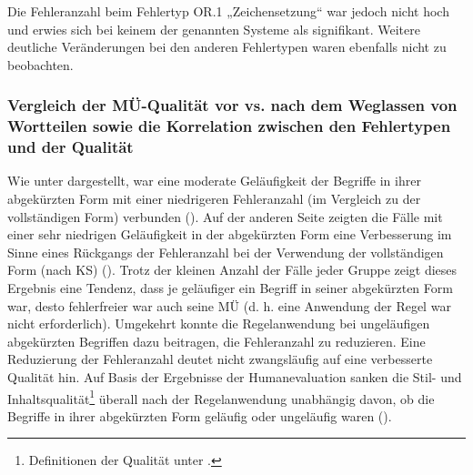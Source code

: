 Die Fehleranzahl beim Fehlertyp OR.1 „Zeichensetzung“ war jedoch nicht hoch und erwies sich bei keinem der genannten Systeme als signifikant. Weitere deutliche Veränderungen bei den anderen Fehlertypen waren ebenfalls nicht zu beobachten.

\subsubsection{Vergleich der MÜ-Qualität vor vs. nach dem Weglassen von Wortteilen sowie die Korrelation zwischen den Fehlertypen und der Qualität}\label{sec:5.3.9.4}

Wie unter  dargestellt, war eine moderate Geläufigkeit der Begriffe in ihrer abgekürzten Form mit einer niedrigeren Fehleranzahl (im Vergleich zu der vollständigen Form) verbunden (). Auf der anderen Seite zeigten die Fälle mit einer sehr niedrigen Geläufigkeit in der abgekürzten Form eine Verbesserung im Sinne eines Rückgangs der Fehleranzahl bei der Verwendung der vollständigen Form (nach KS) (). Trotz der kleinen Anzahl der Fälle jeder Gruppe zeigt dieses Ergebnis eine Tendenz, dass je geläufiger ein Begriff in seiner abgekürzten Form war, desto fehlerfreier war auch seine MÜ (d. h. eine Anwendung der Regel war nicht erforderlich). Umgekehrt konnte die Regelanwendung bei ungeläufigen abgekürzten Begriffen dazu beitragen, die Fehleranzahl zu reduzieren. Eine Reduzierung der Fehleranzahl deutet nicht zwangsläufig auf eine verbesserte Qualität hin. Auf Basis der Ergebnisse der Humanevaluation sanken die Stil- und Inhaltsqualität\footnote{\textrm{Definitionen der Qualität unter .}} überall nach der Regelanwendung unabhängig davon, ob die Begriffe in ihrer abgekürzten Form geläufig oder ungeläufig waren ().


